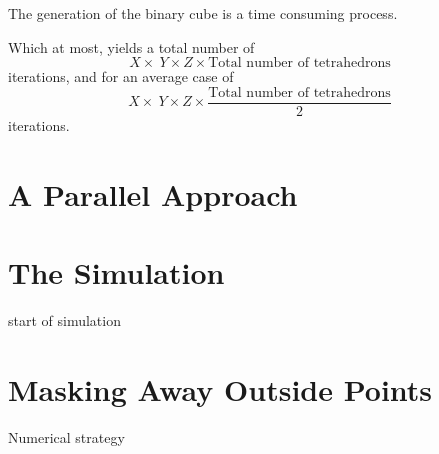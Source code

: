 The generation of the binary cube is a time consuming process. 

Which at most, yields a total number of 
\begin{equation} 
X \times\ Y \times Z  \times \textrm{Total number of tetrahedrons}
\end{equation}  
iterations, and for an average case of 
\begin{equation} 
X \times\ Y \times Z  \times \frac{\textrm{Total number of tetrahedrons}}{2}
\end{equation} 
iterations.  

\section{A Parallel Approach}

\section{The Simulation}
start of simulation

\section{Masking Away Outside Points}
Numerical strategy





